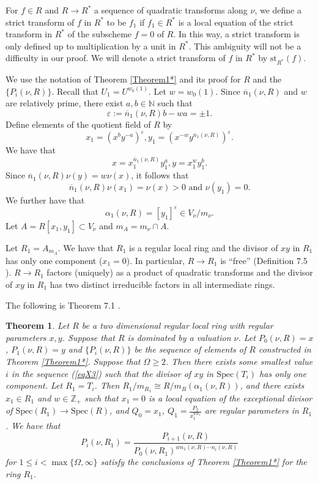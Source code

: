 \documentclass[11pt]{amsart}
\def\NZQ{\mathbb}               %
\def\NN{{\NZQ N}}
\def\ZZ{{\NZQ Z}}
\newtheorem{Theorem}{Theorem}[section]
\let\epsilon\varepsilon
\begin{document}
For $f\in R$ and $R\rightarrow R^*$ a sequence of quadratic transforms along $\nu$, we define a strict transform of $f$ in $R^*$ to be $f_1$ if $f_1\in R^*$  is a local equation of the strict transform  in $R^*$ of the subscheme $f=0$ of $R$. In this way, a strict transform is only defined up to multiplication by a unit in $R^*$. This ambiguity will not be a difficulty in our proof. We will denote a strict transform of $f$ in $R^*$ by $\mbox{st}_{R^*}(f)$.
 
 



We use the notation of Theorem \ref{Theorem1*} and its proof for $R$ and the $\{P_i(\nu,R)\}$. Recall that $U_1=U^{w_0(1)}$. Let $w=w_0(1)$. Since $\overline n_1(\nu,R)$ and $w$ are relatively prime, there exist $a,b\in\NN$ such that 
$$
\epsilon:=\overline n_1(\nu,R)b-wa=\pm 1.
$$
 Define
elements of the quotient field of $R$ by
\begin{equation}\label{eqX50}
x_1=(x^by^{-a})^{\epsilon}, y_1=(x^{-w}y^{\overline n_1(\nu,R)})^{\epsilon}.
\end{equation}
 We have that
\begin{equation}\label{eqZ1}
x=x_1^{\overline n_1(\nu,R)}y_1^a, y=x_1^wy_1^b.
\end{equation}
Since $\overline n_1(\nu,R)\nu(y)=w\nu(x)$, it follows that
$$
\overline n_1(\nu,R)\nu(x_1)=\nu(x)>0\mbox{ and }\nu(y_1)=0.
$$
We further have that
\begin{equation}\label{eqZ3}
\alpha_1(\nu,R)=[y_1]^{\epsilon}\in V_{\nu}/m_{\nu}.
\end{equation}
Let $A=R[x_1,y_1]\subset V_{\nu}$ and $ m_A= m_{\nu}\cap A$. 

Let $R_1=A_{ m_A}$. We have that $R_1$ is a regular local ring and the divisor of $xy$ in $R_1$
 has only one component ($x_1=0$). In particular, $R\rightarrow R_1$ is ``free'' (Definition 7.5 \cite{CP}).
$R\rightarrow R_1$ factors (uniquely) as a product
of quadratic transforms and the divisor of $xy$ in $R_1$  has two distinct irreducible factors in all intermediate rings. 

The following is Theorem 7.1 \cite{CV1}.

\begin{Theorem}\label{birat}
Let $R$ be a two dimensional regular local ring with regular parameters $x,y$. Suppose that $R$ is dominated by a valuation $\nu$. Let $P_0(\nu,R)=x$, $P_1(\nu,R)=y$ and $\{P_i(\nu,R)\}$ be the sequence of elements of $R$ constructed in Theorem \ref{Theorem1*}. Suppose that $\Omega\ge 2$. Then there exists some smallest value $i$ in the sequence (\ref{eqX3}) such that
the divisor of $xy$ in $\mbox{Spec}(T_i)$ has only one component. Let $R_1=T_i$.
Then $R_1/m_{R_1}\cong R/m_R(\alpha_1(\nu,R))$, and there exists $x_1\in R_1$ and $w\in\ZZ_+$ such that
$x_1=0$ is a local equation of the exceptional divisor of $\mbox{Spec}(R_1)\rightarrow \mbox{Spec}(R)$, and $Q_0=x_1$, $Q_1=\frac{P_2}{x_1^{wn_1}}$ are regular parameters in $R_1$. We have that
$$
P_i(\nu,R_1)=\frac{P_{i+1}(\nu,R)}{P_0(\nu,R_1)^{w n_1(\nu,R)\cdots n_i(\nu,R)}}
$$
for $1\le i< \max\{\Omega,\infty\}$
satisfy the conclusions  of Theorem \ref{Theorem1*}  for the ring $R_1$.
\end{Theorem}
\end{document}
